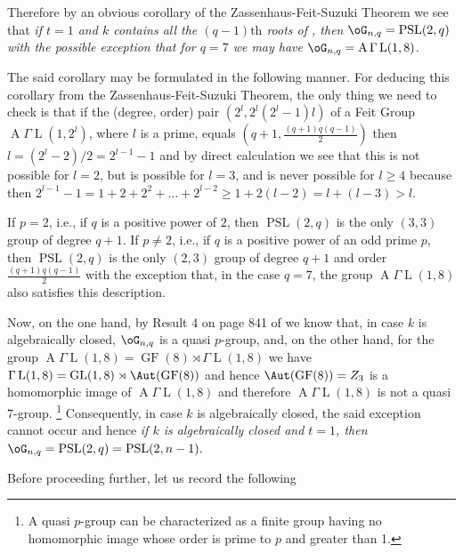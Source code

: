 Therefore by an obvious corollary of the 
Zassenhaus-Feit-Suzuki Theorem
we see that {\it if $t=1$ and $k$
contains all the $(q-1)\text{th}$ roots of \RM, then}
$\oG_{n,q}=\operatorname{PSL}(2,q)$ {\it with the possible 
exception that for $q=7$ we may
have} 
$\oG_{n,q}=\operatorname{A}\Gamma\operatorname{L}(1,8)$.

The said corollary may be formulated in the  following 
manner. For deducing 
this corollary from the Zassenhaus-Feit-Suzuki Theorem, 
the only thing
we need to check is that if the (degree, order) pair 
$(2^l,2^l(2^l-1)l)$
of a Feit Group $\operatorname{A} \Gamma 
\operatorname{L}(1,2^l)$, where $l$ is a prime, equals
$(q+1, \frac{(q+1)q(q-1)}{2})$ then $l= 
(2^l-2)/2=2^{l-1}-1$ and
by direct calculation we see that this is not possible for 
$l=2$, but
is possible for $l=3$, and is never possible for $l \geq 
4$ because
then $2^{l-1}-1=1+2+2^2+ \dots + 2^{l-2} \geq 1+2(l-2)=l+
(l-3) > l$.

If $p=2$, i.e., if $q$ is a positive power of $2$, then 
$\operatorname{PSL}(2,q)$ is
the only $(3,3)$ group of degree $q+1$.  If $p \neq 2$, 
i.e., if $q$
is a positive power of an odd prime $p$, then 
$\operatorname{PSL}(2,q)$ is the only
$(2,3)$ group of degree $q+1$ and 
order $\frac{(q+1)q(q-1)}{2}$ with the exception
that, in the case $q=7$, the group $\operatorname{A} 
\Gamma \operatorname{L}(1,8)$ also satisfies this
description.
\endproclaim

Now, on the one hand, by Result 4 on page 841 of \cite{A3} 
we know that,
in case $k$ is algebraically closed,  
$\oG_{n,q}$ is a quasi $p$-group, and, on the other hand,
for the group $\operatorname{A} \Gamma 
\operatorname{L}(1,8) = \operatorname{GF}(8) \rtimes 
\Gamma \operatorname{L}(1,8)$
we have $\Gamma \operatorname{L}(1,8) = 
\operatorname{GL}(1,8) \rtimes \Aut 
(\operatorname{GF}(8))$ and hence
$\Aut (\operatorname{GF}(8)) = Z_3$ is a homomorphic image 
of $\operatorname{A} \Gamma \operatorname{L}(1,8)$ and
therefore $\operatorname{A} \Gamma \operatorname{L}(1,8)$ 
is not a quasi $7$-group.  
\footnote{A quasi $p$-group can be characterized as a 
finite group having
no homomorphic image whose order is prime to $p$ and 
greater than 1.}
Consequently, in case $k$ is algebraically closed, the 
said exception cannot 
occur and hence {\it if $k$ is algebraically closed and 
$t=1$, then} 
$\oG_{n,q}=\operatorname{PSL}(2,q) = 
\operatorname{PSL}(2,n-1).$


Before proceeding further, let us record the following

